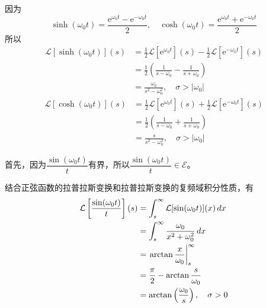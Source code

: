 \begin{example}[双曲函数]
    因为
    \[\sinh(\omega_0 t)=\frac{\mathrm{e}^{\omega_0 t}-\mathrm{e}^{-\omega_0 t}}{2},\quad \cosh(\omega_0 t)=\frac{\mathrm{e}^{\omega_0 t}+\mathrm{e}^{-\omega_0 t}}{2}\]
    所以
    \begin{align*}
        \mathcal{L} \left[\sinh(\omega_0 t)\right](s)&=\frac{1}{2}\mathcal{L} \left[\mathrm{e}^{\omega_0 t}\right](s)-\frac{1}{2}\mathcal{L} \left[\mathrm{e}^{-\omega_0 t}\right](s)\\
        &=\frac{1}{2}\left(\frac{1}{s-\omega_0}-\frac{1}{s+\omega_0}\right)\\
        &=\frac{\omega_0}{s^2-\omega_0^2},\quad \sigma>|\omega_0|
    \end{align*}
    \begin{align*}
        \mathcal{L} \left[\cosh(\omega_0 t)\right](s)&=\frac{1}{2}\mathcal{L} \left[\mathrm{e}^{\omega_0 t}\right](s)+\frac{1}{2}\mathcal{L} \left[\mathrm{e}^{-\omega_0 t}\right](s)\\
        &=\frac{1}{2}\left(\frac{1}{s-\omega_0}+\frac{1}{s+\omega_0}\right)\\
        &=\frac{s}{s^2-\omega_0^2},\quad \sigma>|\omega_0|
    \end{align*}
\end{example}

\begin{example}[采样函数]
    首先，因为$\dfrac{\sin(\omega_0 t)}{t}$有界，所以$\dfrac{\sin(\omega_0 t)}{t}\in\mathcal{E}$。

    结合正弦函数的拉普拉斯变换和拉普拉斯变换的复频域积分性质，有
    \begin{align*}
        \mathcal{L} \left[\frac{\sin(\omega_0 t)}{t}\right](s)&=\int_s^{\infty}\mathcal{L}[\sin(\omega_0 t)](x)\,dx\\
        &=\int_s^{\infty}\frac{\omega_0}{x^2+\omega_0^2}\,dx\\
        &=\left.\arctan\frac{x}{\omega_0}\right|_{s}^{\infty}\\
        &=\frac{\pi}{2}-\arctan\frac{s}{\omega_0}\\
        &=\arctan\left(\frac{\omega_0}{s}\right),\quad \sigma>0
    \end{align*}
\end{example}

